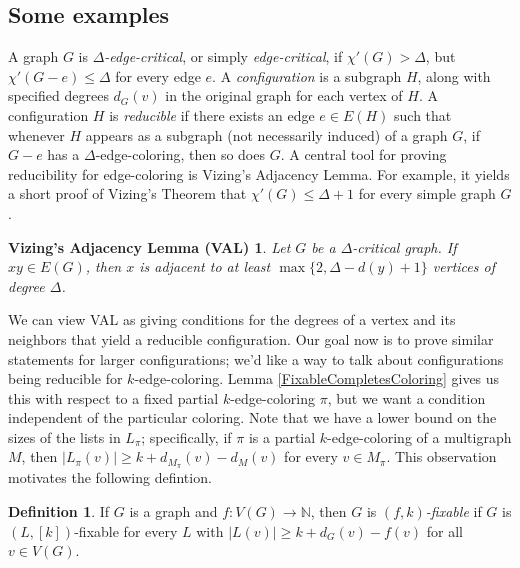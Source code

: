 \documentclass[12pt]{article}
\theoremstyle{plain}
\newtheorem*{VAL}{Vizing's Adjacency Lemma (VAL)}
\theoremstyle{definition}
\newtheorem{defn}{Definition}
\theoremstyle{remark}
\newcommand{\IN}{\mathbb{N}}
\newcommand{\func}[3]{#1\colon #2 \rightarrow #3}
\newcommand{\irange}[1]{\left[#1\right]}
\begin{document}
\subsection{Some examples}
A graph $G$ is \emph{$\Delta$-edge-critical}, or simply \emph{edge-critical},
if $\chi'(G)>\Delta$, but $\chi'(G-e)\le\Delta$ for every edge $e$.  
A \emph{configuration} is a subgraph $H$, along with specified degrees $d_G(v)$
in the original graph for each vertex of $H$. A configuration $H$ is
\emph{reducible} if there exists an edge $e\in E(H)$ such
that whenever $H$ appears as a subgraph (not necessarily induced) of a graph
$G$, if $G-e$ has a $\Delta$-edge-coloring, then so does $G$.
A central tool for proving reducibility for edge-coloring is Vizing's Adjacency
Lemma.  For example, it yields a short proof of Vizing's Theorem that
$\chi'(G)\le \Delta+1$ for every simple graph $G$.

\begin{VAL}
Let $G$ be a $\Delta$-critical graph.  If $xy\in E(G)$, then $x$ is adjacent to
at least $\max\{2,\Delta-d(y)+1\}$ vertices of degree $\Delta$.
\end{VAL}

We can view VAL as giving conditions for the degrees of a vertex and its
neighbors that yield a reducible configuration.  Our goal now is to prove
similar statements for larger configurations; we'd like a way to talk about
configurations being reducible for $k$-edge-coloring. 
Lemma \ref{FixableCompletesColoring} gives us this with respect to a fixed
partial $k$-edge-coloring $\pi$, but we want a condition independent of the
particular coloring.  Note that we have a lower bound on the sizes of the lists
in $L_\pi$; specifically, if $\pi$ is a partial $k$-edge-coloring of a
multigraph $M$, then $|L_{\pi}(v)| \ge k + d_{M_\pi}(v) - d_M(v)$ for every $v
\in M_{\pi}$. 
This observation motivates the following defintion.

\begin{defn}
If $G$ is a graph and $\func{f}{V(G)}{\IN}$, then $G$ is \emph{$(f,k)$-fixable} 
if $G$ is $(L, \irange{k})$-fixable for every $L$ with $|L(v)| \ge k + d_{G}(v)
- f(v)$ for all $v \in V(G)$.
\end{defn}
\end{document}
